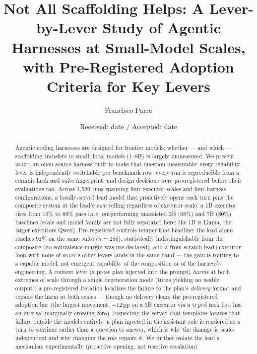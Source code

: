 \documentclass[smallcondensed,natbib]{svjour3}
\title{Not All Scaffolding Helps: A Lever-by-Lever Study of Agentic
Harnesses at Small-Model Scales, with Pre-Registered Adoption Criteria
for Key Levers}
\author{Francisco Parra}
\institute{F. Parra \at
  Departamento de Ingenier\'ia Inform\'atica, Universidad de Santiago de
  Chile, Santiago, Chile \\
  \email{francisco.parra.o@usach.cl}
}
\date{Received: date / Accepted: date}
\newcommand{\braze}{\textsc{braze}}
\begin{document}
\maketitle

\begin{abstract}
Agentic coding harnesses are designed for frontier models; whether ---
and which --- scaffolding transfers to small, local models (1--8B) is
largely unmeasured. We present \braze{}, an open-source harness built
to make that question measurable: every reliability lever is
independently switchable per benchmark row, every run is reproducible
from a commit hash and suite fingerprint, and design decisions were
pre-registered before their evaluations ran. Across 1{,}520 runs
spanning four executor scales and four harness configurations, a
locally-served lead model that proactively opens each turn pins the
composite system
at the lead's \emph{own} ceiling regardless of executor scale: a 1B
executor rises from 19\% to 89\% pass rate, outperforming unassisted
3B (68\%) and 7B (80\%) baselines (scale and model family are not
fully separated here: the 1B is Llama, the larger executors Qwen).
Pre-registered controls temper that headline: the lead alone reaches
91\% on the same suite ($n{=}285$), statistically indistinguishable
from the composite (no equivalence margin was pre-declared), and a
from-scratch lead+executor loop with none of \braze{}'s other levers
lands in the same band --- the gain is routing to a capable model, not
emergent capability of the composition or of the harness's
engineering. A context lever (a prose plan injected into the prompt)
\emph{harms} at both extremes of scale through a single degeneration
mode (turns yielding no usable output); a pre-registered iteration
localizes the failure to the plan's \emph{delivery} format and repairs
the harm at both scales --- though no delivery clears the
pre-registered adoption bar (the largest movement, +12\,pp on a 3B
executor via a typed task list, has an interval marginally crossing
zero). Inspecting the served chat templates locates that failure
outside the models entirely: a plan injected in the assistant role is
rendered as a turn to continue rather than a question to answer, which
is why the damage is scale-independent and why changing the role
repairs it. We further isolate the lead's
mechanism experimentally (proactive opening, not reactive escalation)

\end{abstract}
\end{document}
